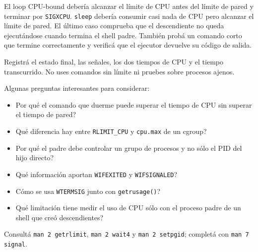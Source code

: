 \documentclass[11pt,a4paper]{article}
\begin{document}
El loop CPU-bound debería alcanzar el límite de CPU antes del límite de pared
y terminar por \texttt{SIGXCPU}. \texttt{sleep} debería consumir casi nada de
CPU pero alcanzar el límite de pared. El último caso comprueba que el
descendiente no queda ejecutándose cuando termina el shell padre. También
probá un comando corto que termine correctamente y verificá que el ejecutor
devuelve su código de salida.

Registrá el estado final, las señales, los dos tiempos de CPU y el tiempo
transcurrido. No uses comandos sin límite ni pruebes sobre procesos ajenos.

Algunas preguntas interesantes para considerar:

\begin{itemize}[leftmargin=*]
  \item Por qué el comando que duerme puede superar el tiempo de CPU sin
  superar el tiempo de pared?
  \item Qué diferencia hay entre \texttt{RLIMIT\_CPU} y \texttt{cpu.max} de
  un cgroup?
  \item Por qué el padre debe controlar un grupo de procesos y no sólo el PID
  del hijo directo?
  \item Qué información aportan \texttt{WIFEXITED} y
  \texttt{WIFSIGNALED}?
  \item Cómo se usa \texttt{WTERMSIG} junto con
  \texttt{getrusage()}?
  \item Qué limitación tiene medir el uso de CPU sólo con el proceso padre de
  un shell que creó descendientes?
\end{itemize}

Consultá \texttt{man 2 getrlimit}, \texttt{man 2 wait4} y
\texttt{man 2 setpgid}; completá con \texttt{man 7 signal}.
\end{document}
